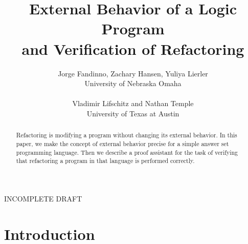 \documentclass{article}
\begin{document}
\title{\bf External Behavior of a Logic Program\\
  and Verification of Refactoring}
\author{Jorge Fandinno, Zachary Hansen, Yuliya Lierler\\
  University of Nebraska Omaha\\ \\
Vladimir Lifschitz and Nathan Temple\\ University of Texas at Austin}
\date{}

\maketitle

\begin{center}INCOMPLETE DRAFT\end{center}

\begin{abstract}
  Refactoring is modifying a program without changing its external behavior.
  In this paper, we
  make the concept of external behavior precise for a simple answer set
  programming language.  Then we describe a proof assistant for the
  task of verifying
  that refactoring a program in that language is performed correctly.
\end{abstract}
  
\section{Introduction}
\end{document}
